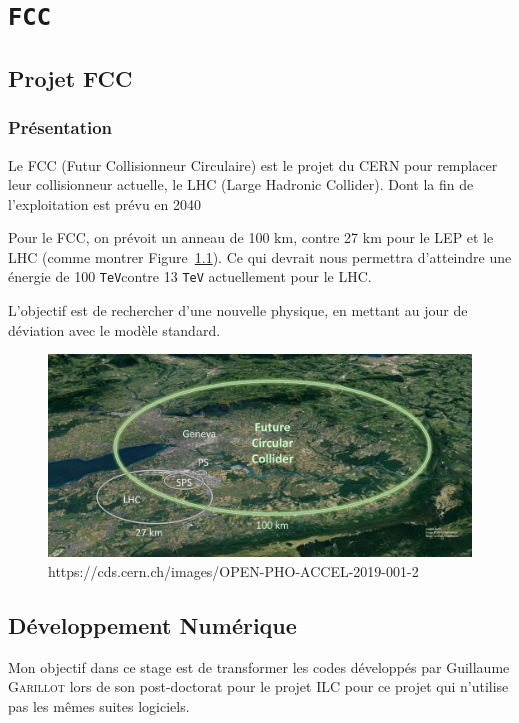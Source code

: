 \documentclass[10pt,a4paper]{report}
\newcommand{\TeV}{\texttt{TeV}}
\begin{document}

\chapter{\texttt{FCC}}

\section{Projet FCC}

\subsection{Présentation}

Le FCC (Futur Collisionneur Circulaire) est le projet du CERN pour remplacer 
leur collisionneur actuelle, le LHC (Large Hadronic Collider). 
Dont la fin de l'exploitation est prévu en 2040 \cite{cern:fcc}

Pour le FCC, on prévoit un anneau de 100 km, contre 27 km pour le LEP et le LHC 
(comme montrer Figure~\ref{fcc:img}).
Ce qui devrait nous permettra d'atteindre une énergie de 100 \TeV contre 13 \TeV
actuellement pour le LHC.

L'objectif est de rechercher d'une nouvelle physique, en mettant au jour de 
déviation avec le modèle standard.


\begin{figure}[h!]
    \centering
    \includegraphics[width=\textwidth]{../img/FCC.jpg}
    \caption{https://cds.cern.ch/images/OPEN-PHO-ACCEL-2019-001-2}
    \label{fcc:img}
\end{figure}

\section{Développement Numérique}

Mon objectif dans ce stage est de transformer les codes développés par Guillaume 
\textsc{Garillot} lors de son post-doctorat pour le projet ILC pour ce projet 
qui n'utilise pas les mêmes suites logiciels.
\end{document}
